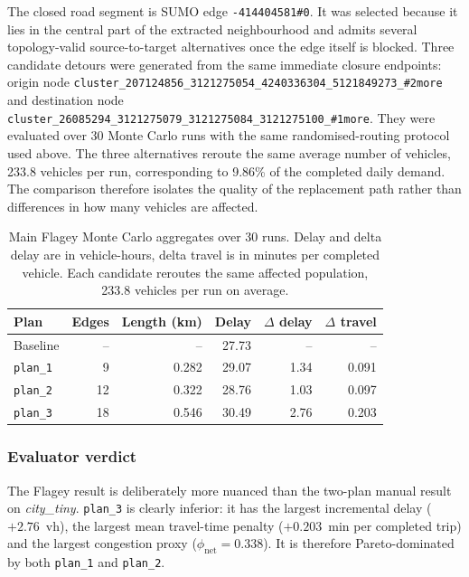 The closed road segment is SUMO edge \texttt{-414404581\#0}. It was selected
because it lies in the central part of the extracted neighbourhood and admits
several topology-valid source-to-target alternatives once the edge itself is
blocked. Three candidate detours were generated from the same immediate
closure endpoints: origin node
\nolinkurl{cluster_207124856_3121275054_4240336304_5121849273_#2more}
and destination node
\nolinkurl{cluster_26085294_3121275079_3121275084_3121275100_#1more}.
They were evaluated over 30 Monte Carlo runs with the same
randomised-routing protocol used above. The three alternatives reroute the
same average number of vehicles, 233.8 vehicles per run, corresponding to
9.86\% of the completed daily demand. The comparison therefore isolates the
quality of the replacement path rather than differences in how many vehicles
are affected.

\begin{table}[H]
\centering
\begin{tabular}{@{}lrrrrr@{}}
\toprule
Plan & Edges & Length (km) & Delay & $\Delta$ delay & $\Delta$ travel \\
\midrule
Baseline & -- & -- & 27.73 & -- & -- \\
\texttt{plan\_1} & 9 & 0.282 & 29.07 & 1.34 & 0.091 \\
\texttt{plan\_2} & 12 & 0.322 & 28.76 & 1.03 & 0.097 \\
\texttt{plan\_3} & 18 & 0.546 & 30.49 & 2.76 & 0.203 \\
\bottomrule
\end{tabular}
\caption{Main Flagey Monte Carlo aggregates over 30 runs. Delay and delta
delay are in vehicle-hours, delta travel is in minutes per completed vehicle.
Each candidate reroutes the same affected population, 233.8 vehicles per run
on average.}
\label{tab:results_flagey_mc_summary}
\end{table}

\subsubsection{Evaluator verdict}
The Flagey result is deliberately more nuanced than the two-plan manual result
on \emph{city\_tiny}. \texttt{plan\_3} is clearly inferior: it has the largest
incremental delay ($+2.76$~vh), the largest mean travel-time penalty
($+0.203$~min per completed trip) and the largest congestion proxy
($\phi_\text{net}=0.338$). It is therefore Pareto-dominated by both
\texttt{plan\_1} and \texttt{plan\_2}.

